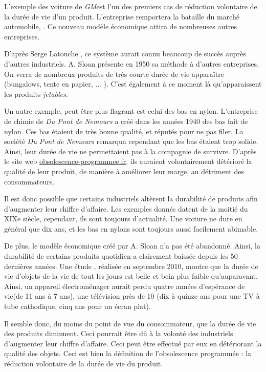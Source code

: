 \smallbreak
L'exemple des voiture de \textit{GM}est l'un des premiers cas de réduction volontaire de la durée de vie d'un produit. L'entreprise remportera la bataille du marché automobile, .
Ce nouveau modèle économique attira de nombreuses autres entreprises. 

D'après Serge Latouche \cite{bpc}, ce système aurait connu beaucoup de succès auprès d'autres industriels. A. Sloan présente en 1950 sa méthode à d'autres entreprises. On verra de nombreux produits de très courte durée de vie apparaître (bungalows, tente en papier, ... ). C'est également à ce moment là qu'apparaissent les produits \textit{jetables}.

Un autre exemple, peut être plus flagrant est celui des bas en nylon.
L'entreprise de chimie de \textit{Du Pont de Nemours} a créé dans les années 1940 des bas fait de nylon.
Ces bas étaient de très bonne qualité, et réputés pour ne pas filer. La société \textit{Du Pont de Nemours} remarqua cependant que les bas étaient trop solide. 
Ainsi, leur durée de vie ne permettaient pas à la compagnie de survivre.
D'après le site web \url{obsolescence-programmee.fr}, ils auraient volontairement détérioré la qualité de leur produit, de manière à améliorer leur marge, au détriment des consommateurs. 

\smallbreak

Il est donc possible que certains industriels altèrent la durabilité de produits afin d'augmenter leur chiffre d'affaire. Les exemples donnés datent de la moitié du XIXe siècle, cependant, ils sont toujours d'actualité. Une voiture ne dure en général que dix ans, et les bas en nylons sont toujours aussi facilement abimable. 

De plus, le modèle économique créé par A. Sloan n'a pas été abandonné. Ainsi, la durabilité de certains produits quotidien a clairement baissée depuis les 50 dernières années. 
Une étude \cite{opSsg}, réalisée en septembre 2010, montre que la durée de vie d'objets de la vie de tout les jours est belle et bein plus faible qu'auparavant.
Ainsi, un appareil électroménager aurait perdu quatre années d'espérance de vie(de 11 ans à 7 ans), une télévision près de 10 (dix à quinze ans pour une TV à tube cathodique, cinq ans pour un écran plat). 

Il semble donc, du moins du point de vue du consommateur, que la durée de vie des produits diminuent. Ceci pourrait être dû à la volonté des industriels d'augmenter leur chiffre d'affaire. Ceci peut être effectué par eux en détériorant la qualité des objets. Ceci est bien la définition de l'obsolescence programmée : la réduction volontaire de la durée de vie du produit. 
